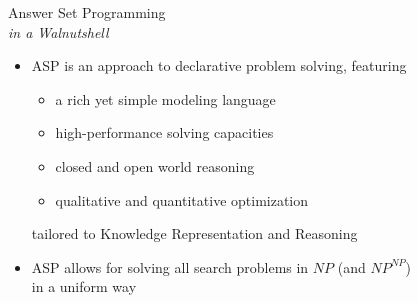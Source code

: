 \begin{frame}{Answer Set Programming\\[-2pt]\small\emph{in a Walnutshell}}
  \medskip
  \begin{itemize}
  \item <1->
    ASP is an approach to \alert{declarative problem solving},
    featuring
    \begin{itemize}
    \item a rich yet simple modeling language
    \item high-performance solving capacities
    \item closed and open world reasoning
    \item qualitative and quantitative optimization
    \end{itemize}
    tailored to \alert<1>{Knowledge Representation and Reasoning} %
    \smallskip
  \item <2->
    ASP allows for solving all search problems in $NP$ (and $NP^{NP}$)
    \\in a uniform way %
  \end{itemize}
  \bigskip
\end{frame}
